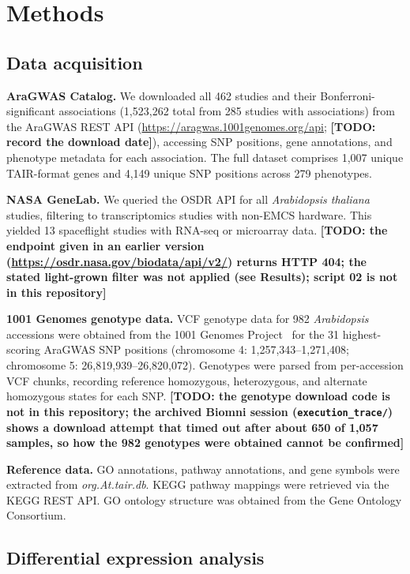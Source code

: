\documentclass[sn-mathphys-num,Basic]{sn-jnl}
\begin{document}
\section{Methods}

\subsection{Data acquisition}

\textbf{AraGWAS Catalog.} We downloaded all 462 studies and their Bonferroni-significant associations (1,523,262 total from 285 studies with associations) from the AraGWAS REST API (\url{https://aragwas.1001genomes.org/api}; \textbf{[TODO: record the download date]}), accessing SNP positions, gene annotations, and phenotype metadata for each association. The full dataset comprises 1,007 unique TAIR-format genes and 4,149 unique SNP positions across 279 phenotypes.

\textbf{NASA GeneLab.} We queried the OSDR API for all \textit{Arabidopsis thaliana} studies, filtering to transcriptomics studies with non-EMCS hardware. This yielded 13 spaceflight studies with RNA-seq or microarray data. \textbf{[TODO: the endpoint given in an earlier version (\url{https://osdr.nasa.gov/biodata/api/v2/}) returns HTTP 404; the stated light-grown filter was not applied (see Results); script 02 is not in this repository]}

\textbf{1001 Genomes genotype data.} VCF genotype data for 982 \textit{Arabidopsis} accessions were obtained from the 1001 Genomes Project~\cite{AlonsoBlanco2016} for the 31 highest-scoring AraGWAS SNP positions (chromosome 4: 1,257,343--1,271,408; chromosome 5: 26,819,939--26,820,072). Genotypes were parsed from per-accession VCF chunks, recording reference homozygous, heterozygous, and alternate homozygous states for each SNP. \textbf{[TODO: the genotype download code is not in this repository; the archived Biomni session (\texttt{execution\_trace/}) shows a download attempt that timed out after about 650 of 1,057 samples, so how the 982 genotypes were obtained cannot be confirmed]}

\textbf{Reference data.} GO annotations, pathway annotations, and gene symbols were extracted from \textit{org.At.tair.db}. KEGG pathway mappings were retrieved via the KEGG REST API. GO ontology structure was obtained from the Gene Ontology Consortium.

\subsection{Differential expression analysis}
\end{document}
